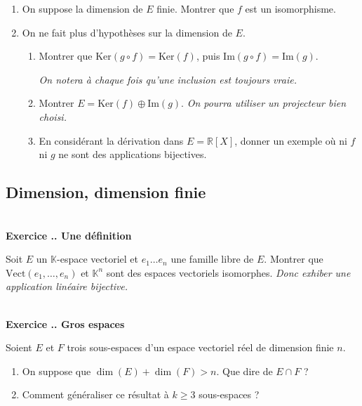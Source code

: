 \documentclass{article}
\newcommand{\mb}[1]{\mathbb{#1}}
\newcounter{exo}
\newcommand{\exercice}[1][\null]{\textbf{\\ Exercice \thesection.\theexo. #1} \addtocounter{exo}{1}}
\begin{document}
\begin{enumerate}

\item On suppose la dimension de $E$ finie. Montrer que $f$ est un isomorphisme.

\item On ne fait plus d'hypothèses sur la dimension de $E$.

\begin{enumerate}

\item Montrer que $\text{Ker}(g \circ f) = \text{Ker}(f)$, puis $\text{Im}(g \circ f) = \text{Im}(g)$.

\emph{On notera à chaque fois qu'une inclusion est toujours vraie.}

\item Montrer $E = \text{Ker}(f) \oplus \text{Im}(g)$. \emph{On pourra utiliser un projecteur bien choisi.}

\item En considérant la dérivation dans $E = \mb{R}[X]$, donner un exemple où ni $f$ ni $g$ ne sont des applications bijectives.

\end{enumerate}

\end{enumerate}




\subsection{Dimension, dimension finie}

 \exercice[Une définition]

Soit $E$ un $\mb{K}$-espace vectoriel et $e_1 \dots e_n$ une famille libre de $E$. Montrer que $\text{Vect}(e_1, \dots, e_n)$ et $\mb{K}^n$ sont des espaces vectoriels isomorphes. \emph{Donc exhiber une application linéaire bijective.}

\exercice[Gros espaces]

Soient $E$ et $F$ trois sous-espaces d'un espace vectoriel réel de dimension finie $n$.

\begin{enumerate}

\item On suppose que $\dim(E) + \dim(F) > n$. Que dire de $E \cap F$ ?

\item Comment généraliser ce résultat à $k \ge 3$ sous-espaces ?


\end{enumerate}
\end{document}
